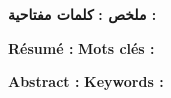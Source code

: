 

\vfill
\begin{Arabic}
	{\noindent\bfseries\large ملخص :}  
	\Rar
	\bigskip
	{\noindent\bfseries\large كلمات مفتاحية :}  
	\Mar  
\end{Arabic}

\vfill

{\noindent\bfseries\large Résumé :}  
\Rfr
\bigskip  
{\noindent\bfseries Mots clés :}  
\Mfr

\vfill

{\noindent\bfseries\large Abstract :}  
\Ren 
\bigskip  
{\noindent\bfseries Keywords :}  
\Men  

\vfill